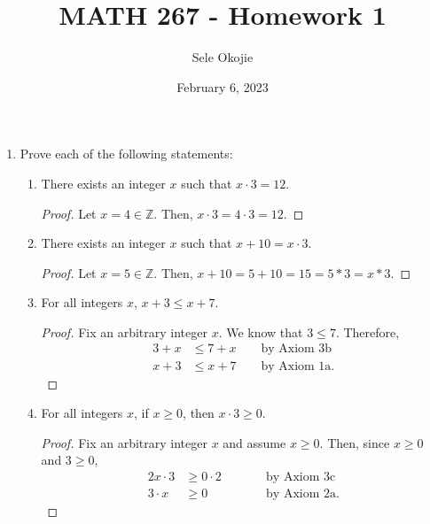 \documentclass{article}
\title{MATH 267 - Homework 1}
\author{Sele Okojie}
\date{February 6, 2023}
\begin{document}
    \maketitle
    
    \begin{enumerate}
    	\item Prove each of the following statements:
    		\begin{enumerate}
      
    			\item There exists an integer $x$ such that $x \cdot 3 = 12$.
                        \begin{proof}
                            Let $x = 4 \in \mathbb{Z}$. Then, $x \cdot 3 = 4 \cdot 3 = 12$.
                        \end{proof}

    			\item There exists an integer $x$ such that $x + 10 = x \cdot 3$.
                        \begin{proof}
                            Let $x = 5 \in \mathbb{Z}$. Then, $x + 10 = 5 + 10 = 15 = 5 * 3 = x * 3$.
                        \end{proof}

    			\item For all integers $x$, $x + 3 \le x + 7$.
                        \begin{proof}
                            Fix an arbitrary integer $x$. We know that $3 \leq 7$. Therefore,
                            \begin{align*}
                                3 + x &\le 7 + x            \qquad\textrm{by Axiom 3b}      \\  %
                                x + 3 &\le x + 7            \qquad\textrm{by Axiom 1a.} %
                            \end{align*}
                        \end{proof}

    			\item For all integers $x$, if $x \ge 0$, then $x \cdot 3 \ge 0$.
                        \begin{proof}
                            Fix an arbitrary integer $x$ and assume $x \ge 0$. Then, since $x \ge 0$ and $3 \ge 0$,
                            \begin{alignat*}{2}
                                x \cdot 3 &\ge 0 \cdot 2    &\qquad &\textrm{by Axiom 3c}   \\
                                3 \cdot x &\ge 0            &\qquad &\textrm{by Axiom 2a.}
                            \end{alignat*}
                        \end{proof}


\end{enumerate}
\end{enumerate}
\end{document}
